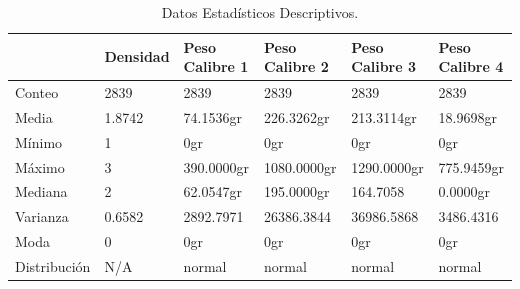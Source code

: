 \begin{table}[htbp]
\begin{center}
\begin{tabular}{|l|l|l|l|l|l|}
\hline
& Densidad & Peso Calibre 1 & Peso Calibre 2 & Peso Calibre 3 & Peso Calibre 4  \\
\hline \hline
Conteo & 2839 & 2839 & 2839 & 2839 & 2839  \\ \hline
Media & 1.8742 & 74.1536gr & 226.3262gr & 213.3114gr & 18.9698gr  \\ \hline
Mínimo & 1 & 0gr & 0gr & 0gr & 0gr  \\ \hline
Máximo & 3 & 390.0000gr & 1080.0000gr & 1290.0000gr & 775.9459gr  \\ \hline
Mediana & 2 & 62.0547gr &195.0000gr & 164.7058 & 0.0000gr \\ \hline
Varianza & 0.6582 & 2892.7971 & 26386.3844 & 36986.5868 & 3486.4316 \\ \hline
Moda & 0 & 0gr & 0gr & 0gr & 0gr  \\ \hline
Distribución & N/A & normal & normal & normal & normal  \\ \hline
\end{tabular}
\caption{Datos Estadísticos Descriptivos.}
\label{tabla:sencilla}
\end{center}
\end{table}

